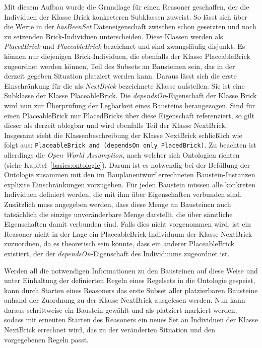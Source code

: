 Mit diesem Aufbau wurde die Grundlage für einen Reasoner geschaffen, der die Individuen der Klasse Brick konkreteren Subklassen zuweist.
So lässt sich über die Werte in der \textit{hasBeenSet} Dateneigenschaft zwischen schon gesetzten und noch zu setzenden Brick-Individuen unterscheiden.
Diese Klassen werden als \textit{PlacedBrick} und \textit{PlaceableBrick} bezeichnet und sind zwangsläufig disjunkt.
Es können nur diejenigen Brick-Individuen, die ebenfalls der Klasse PlaceableBrick zugeordnet werden können, Teil des Subsets an Bausteinen sein, das in der derzeit gegeben Situation platziert werden kann.
Daraus lässt sich die erste Einschränkung für die als \textit{NextBrick} bezeichnete Klasse aufstellen:
Sie ist eine Subklasse der Klasse PlaceableBrick.
Die  \textit{dependsOn}-Eigenschaft der Klasse Brick wird nun zur Überprüfung der Legbarkeit eines Bausteins herangezogen.
Sind für einen PlaceableBrick nur PlacedBricks über diese Eigenschaft referenziert, so gilt dieser als derzeit ablegbar und wird ebenfalls Teil der Klasse NextBrick.
Insgesamt sieht die Klassenbeschreibung der Klasse NextBrick schließlich wie folgt aus:
\lstinline{PlaceableBrick and (dependsOn only PlacedBrick)}.
Zu beachten ist allerdings die \textit{Open World Assumption}, nach welcher sich Ontologien richten (siehe Kapitel~\ref{basics:ontologie}).
Darum ist es notwendig bei der Befüllung der Ontologie zusammen mit den im Bauplanentwurf errechneten Baustein-Instanzen explizite Einschränkungen vorzugeben.
Für jeden Baustein müssen alle konkreten Individuen definiert werden, die mit ihm über Eigenschaften verbunden sind.
Zusätzlich muss angegeben werden, dass diese Menge an Bausteinen auch tatsächlich die einzige unveränderbare Menge darstellt, die über sämtliche Eigenschaften damit verbunden sind.
Falls dies nicht vorgenommen wird, ist ein Reasoner nicht in der Lage ein PlaceableBrick-Individuum der Klasse NextBrick zuzuordnen, da es theoretisch sein könnte, dass ein anderer PlaceableBrick existiert, der der \textit{dependsOn}-Eigenschaft des Individuums zugeordnet ist.

Werden all die notwendigen Informationen zu den Bausteinen auf diese Weise und unter Einhaltung der definierten Regeln eines Regelsets in die Ontologie gespeist, kann durch Starten eines Reasoners das erste Subset aller platzierbaren Bausteine anhand der Zuordnung zu der Klasse NextBrick ausgelesen werden.
Nun kann daraus schrittweise ein Baustein gewählt und als platziert markiert werden, sodass mit erneuten Starten des Reasoners ein neues Set an Individuen der Klasse NextBrick errechnet wird, das zu der veränderten Situation und den vorgegebenen Regeln passt.
